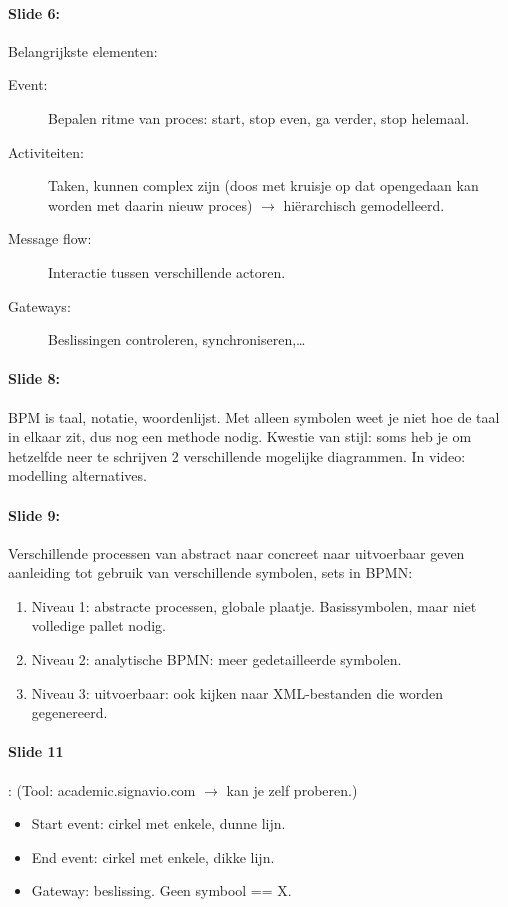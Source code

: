 \documentclass[10pt,a4paper]{report}
\begin{document}
\paragraph{Slide 6:}Belangrijkste elementen:
\begin{description}
\item[Event:]Bepalen ritme van proces: start, stop even, ga verder, stop helemaal.
\item[Activiteiten:]Taken, kunnen complex zijn (doos met kruisje op dat opengedaan kan worden met daarin nieuw proces) $\rightarrow$ hiërarchisch gemodelleerd.
\item[Message flow:]Interactie tussen verschillende actoren.
\item[Gateways:]Beslissingen controleren, synchroniseren,…
\end{description}

\paragraph{Slide 8:}BPM is taal, notatie, woordenlijst. Met alleen symbolen weet je niet hoe de taal in elkaar zit, dus nog een methode nodig. Kwestie van stijl: soms heb je om hetzelfde neer te schrijven 2 verschillende mogelijke diagrammen. In video: modelling alternatives.

\paragraph{Slide 9:}Verschillende processen van abstract naar concreet naar uitvoerbaar geven aanleiding tot gebruik van verschillende symbolen, sets in BPMN:
\begin{enumerate}
\item Niveau 1: abstracte processen, globale plaatje. Basissymbolen, maar niet volledige pallet nodig.
\item Niveau 2: analytische BPMN: meer gedetailleerde symbolen.
\item Niveau 3: uitvoerbaar: ook kijken naar XML-bestanden die worden gegenereerd.
\end{enumerate}

\paragraph{Slide 11}: (Tool: academic.signavio.com $\rightarrow$ kan je zelf proberen.)
\begin{itemize}
\item Start event: cirkel met enkele, dunne lijn.
\item End event: cirkel met enkele, dikke lijn.
\item Gateway: beslissing. Geen symbool == X.
\end{itemize}
\end{document}

